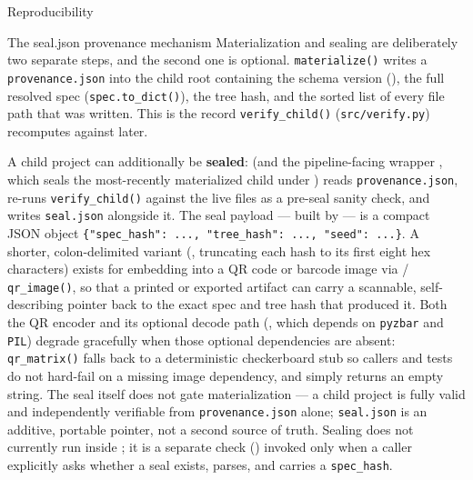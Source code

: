 \documentclass[
  ignorenonframetext,
]{beamer}
\begin{document}
\begin{frame}{Reproducibility}
\begin{block}{The seal.json provenance mechanism}
\protect{}\label{the-seal.json-provenance-mechanism}
Materialization and sealing are deliberately two separate steps, and the
second one is optional. \texttt{materialize()} writes a
\texttt{provenance.json} into the child root containing the schema
version
(),
the full resolved spec (\texttt{spec.to\_dict()}), the tree hash, and
the sorted list of every file path that was written. This is the record
\texttt{verify\_child()} (\texttt{src/verify.py}) recomputes against
later.

A child project can additionally be \textbf{sealed}:
 (and the pipeline-facing wrapper
, which seals the most-recently materialized
child under ) reads \texttt{provenance.json},
re-runs \texttt{verify\_child()} against the live files as a pre-seal
sanity check, and writes \texttt{seal.json} alongside it. The seal
payload --- built by  --- is a
compact JSON object
\texttt{\{"spec\_hash":\ ...,\ "tree\_hash":\ ...,\ "seed":\ ...\}}. A
shorter, colon-delimited variant (,
truncating each hash to its first eight hex characters) exists for
embedding into a QR code or barcode image via
 / \texttt{qr\_image()}, so that a
printed or exported artifact can carry a scannable, self-describing
pointer back to the exact spec and tree hash that produced it. Both the
QR encoder and its optional decode path (,
which depends on \texttt{pyzbar} and \texttt{PIL}) degrade gracefully
when those optional dependencies are absent: \texttt{qr\_matrix()} falls
back to a deterministic checkerboard stub so callers and tests do not
hard-fail on a missing image dependency, and 
simply returns an empty string. The seal itself does not gate
materialization --- a child project is fully valid and independently
verifiable from \texttt{provenance.json} alone; \texttt{seal.json} is an
additive, portable pointer, not a second source of truth. Sealing does
not currently run inside ; it is a
separate check () invoked only
when a caller explicitly asks whether a seal exists, parses, and carries
a \texttt{spec\_hash}.
\end{block}


\end{frame}
\end{document}
